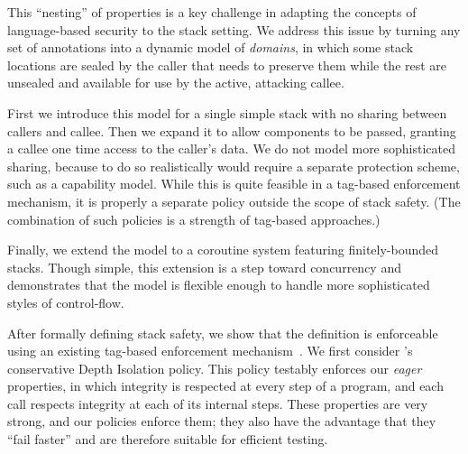 \documentclass[acmsmall,review,anonymous]{acmart}\settopmatter{printfolios=true,printccs=false,printacmref=false}
\begin{document}
This ``nesting'' of properties is a key challenge in adapting the concepts
of language-based security to the stack setting. We address this issue by
turning any set of annotations into a dynamic model of {\em domains},
in which some stack locations are sealed by the caller that needs to preserve
them while the rest are unsealed and available for use by the active, attacking
callee.

First we introduce this model for a single simple stack with no sharing between callers and
callee. Then we expand it to allow components to be passed, granting a callee one time
access to the caller's data. We do not model more sophisticated sharing, because to do
so realistically would require a separate protection scheme, such as a capability
model. While this is quite feasible in a tag-based enforcement mechanism, it is properly
a separate policy outside the scope of stack safety. (The combination of such policies is
a strength of tag-based approaches.)

Finally, we extend the model to a coroutine system featuring finitely-bounded stacks. Though
simple, this extension is a step toward concurrency and demonstrates that the model is flexible
enough to handle more sophisticated styles of control-flow.

After formally defining stack safety, we show that the definition is
enforceable using an existing tag-based enforcement
mechanism~\citep{DBLP:conf/sp/RoesslerD18}. We first consider
\citeauthor{DBLP:conf/sp/RoesslerD18}'s conservative Depth Isolation policy.
This policy testably enforces our {\em eager} properties, in which integrity is respected
at every step of a program, and each call respects integrity at each of its internal steps.
These properties are very strong, and our policies enforce them; they also have the advantage
that they ``fail faster'' and are therefore suitable for efficient testing.
\end{document}
